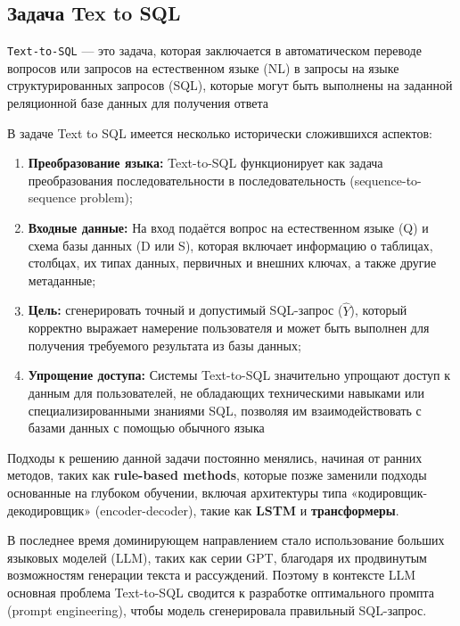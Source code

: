 \subsection{Задача Tex to SQL}


\texttt{Text-to-SQL} — это задача, которая заключается в автоматическом переводе вопросов или запросов на естественном языке (NL) в запросы на языке структурированных запросов (SQL), которые могут быть выполнены на заданной реляционной базе данных для получения ответа

В задаче Text to SQL имеется несколько исторически сложившихся аспектов:

\begin{enumerate}
    \item \textbf{Преобразование языка:} Text-to-SQL функционирует как задача преобразования последовательности в последовательность (sequence-to-sequence problem);
    \item \textbf{Входные данные:} На вход подаётся вопрос на естественном языке (Q) и схема базы данных (D или S), которая включает информацию о таблицах, столбцах, их типах данных, первичных и внешних ключах, а также другие метаданные;
    \item \textbf{Цель:} сгенерировать точный и допустимый SQL-запрос ($\hat{Y}$), который корректно выражает намерение пользователя и может быть выполнен для получения требуемого результата из базы данных;
    \item \textbf{Упрощение доступа:} Системы Text-to-SQL значительно упрощают доступ к данным для пользователей, не обладающих техническими навыками или специализированными знаниями SQL, позволяя им взаимодействовать с базами данных с помощью обычного языка
\end{enumerate}

Подходы к решению данной задачи постоянно менялись, начиная от ранних методов, таких как \textbf{rule-based methods}, которые позже заменили подходы основанные на глубоком обучении, включая архитектуры типа «кодировщик-декодировщик» (encoder-decoder), такие как \textbf{LSTM} и \textbf{трансформеры}.

В последнее время доминирующем направлением стало использование больших языковых моделей (LLM), таких как серии GPT, благодаря их продвинутым возможностям генерации текста и рассуждений. Поэтому в контексте LLM основная проблема Text-to-SQL сводится к разработке оптимального промпта (prompt engineering), чтобы модель сгенерировала правильный SQL-запрос.



